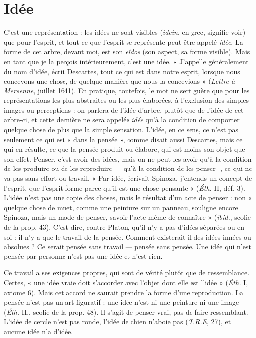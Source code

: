 \section{Idée}
C’est une représentation : les idées ne sont visibles ({\it idein}, en grec,
signifie voir) que pour l’esprit, et tout ce que l’esprit se représente
peut être appelé {\it idée}. La forme de cet arbre, devant moi, est son {\it eîdos} (son
aspect, sa forme visible). Mais en tant que je la perçois intérieurement, c’est
une idée. « J’appelle généralement du nom d’idée, écrit Descartes, tout ce qui
est dans notre esprit, lorsque nous concevons une chose, de quelque manière
que nous la concevions » ({\it Lettre à Mersenne}, juillet 1641). En pratique, toutefois,
le mot ne sert guère que pour les représentations les plus abstraites ou
les plus élaborées, à l'exclusion des simples images ou perceptions : on parlera
de l’idée d’arbre, plutôt que de l’idée de cet arbre-ci, et cette dernière ne sera
appelée {\it idée} qu’à la condition de comporter quelque chose de plus que la
simple sensation. L’idée, en ce sens, ce n’est pas seulement ce qui est « dans
la pensée », comme disait aussi Descartes, mais ce qui en résulte, ce que la
pensée produit ou élabore, qui est moins son objet que son effet. Penser, c’est
avoir des idées, mais on ne peut les avoir qu’à la condition de les produire ou
de les reproduire — qu’à la condition de les penser -, ce qui ne va pas sans
effort ou travail. « Par idée, écrivait Spinoza, j'entends un concept de l'esprit,
que l'esprit forme parce qu’il est une chose pensante » ({\it Éth.} II, déf. 3). L'idée
n’est pas une copie des choses, mais le résultat d’un acte de penser : non
« quelque chose de muet, comme une peinture sur un panneau, souligne
encore Spinoza, mais un mode de penser, savoir l’acte même de connaître »
({\it ibid.}, scolie de la prop. 43). C’est dire, contre Platon, qu’il n’y a pas d’idées
séparées ou en soi : il n’y a que le travail de la pensée. Comment existerait-il
des idées innées ou absolues ? Ce serait pensée sans travail — pensée sans
pensée. Une idée qui n’est pensée par personne n’est pas une idée et n’est
rien.

Ce travail a ses exigences propres, qui sont de vérité plutôt que de ressemblance.
Certes, « une idée vraie doit s’accorder avec l’objet dont elle est l’idée »
({\it Éth.} I, axiome 6). Mais cet accord ne saurait prendre la forme d’une reproduction.
La pensée n’est pas un art figuratif : une idée n’est ni une peinture ni une
image ({\it Éth.} II., scolie de la prop. 48). Il s’agit de penser vrai, pas de faire ressemblant.
L'idée de cercle n’est pas ronde, l’idée de chien n’aboie pas ({\it T.R.E},
27), et aucune idée n’a d’idée.

